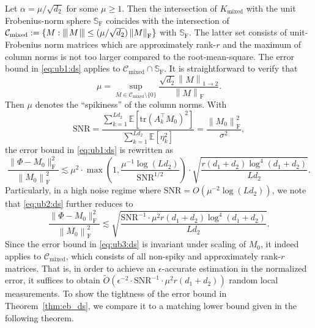 \documentclass[11pt]{article}
\newcommand{\xspace}{\hbox{\kern-2.5pt}}
\newcommand\tnorm[1]{\left\vert\xspace\left\vert\xspace\left\vert\mskip2mu
#1\mskip2mu \right\vert\xspace\right\vert\xspace\right\vert}
\newcommand{\norm}[1]{\left \|#1 \right \|}
\begin{document}
Let $\alpha = \mu/\sqrt{d_2}$ for some $\mu \geq 1$. 
Then the intersection of $K_\mathrm{mixed}$ with the unit Frobenius-norm sphere $\mathbb{S}_\mathrm{F}$ coincides with the intersection of $\mathcal{C}_\mathrm{mixed} := \{M : \tnorm{M} \leq (\mu/\sqrt{d_2}) \norm{M}_\mathrm{F}\}$ with $\mathbb{S}_\mathrm{F}$. 
The latter set consists of unit-Frobenius norm matrices which are approximately rank-$r$ and the maximum of column norms is not too larger compared to the root-mean-square. 
The error bound in \eqref{eq:ub1:ds} applies to $\mathcal{C}_\mathrm{mixed} \cap \mathbb{S}_\mathrm{F}$. 
It is straightforward to verify that
\[
\mu = \sup_{M \in \mathcal{C}_\mathrm{mixed}\setminus\{0\}} \frac{\sqrt{d_2} \norm{M}_{1\to 2}}{\norm{M}_\mathrm{F}}.
\]
Then $\mu$ denotes the ``spikiness'' of the column norms. 
With 
\[
\text{SNR} = \frac{\sum_{k=1}^{Ld_2} \mathbb{E}[\mathrm{tr}(A_k^\top M_0)^2]}{\sum_{k=1}^{Ld_2} \mathbb{E}[\eta_k^2]}
= \frac{\norm{M_0}_\mathrm{F}^2}{\sigma^2},
\]
the error bound in \eqref{eq:ub1:ds} is rewritten as 
\begin{equation}
\label{eq:ub2:ds}
\frac{\|\Phi - M_0\|_\mathrm{F}^2}{\norm{M_0}_\text{F}^2}
\lesssim \mu^2 \cdot \max\left(1, \frac{\mu^{-1} \log(Ld_2)}{\text{SNR}^{1/2}} \right) \cdot \sqrt{\frac{r(d_1+d_2)\log^4(d_1+d_2)}{Ld_2}}.
\end{equation}
Particularly, in a high noise regime where $\text{SNR} = O(\mu^{-2} \log(Ld_2))$, we note that \eqref{eq:ub2:ds} further reduces to 
\begin{equation}
\label{eq:ub3:ds}
\frac{\|\Phi - M_0\|_\mathrm{F}^2}{\norm{M_0}_\text{F}^2}
\lesssim \sqrt{\frac{\text{SNR}^{-1} \cdot \mu^2 r(d_1+d_2)\log^4(d_1+d_2)}{Ld_2}}. 
\end{equation}
Since the error bound in \eqref{eq:ub3:ds} is invariant under scaling of $M_0$, it indeed applies to $\mathcal{C}_\mathrm{mixed}$, which consists of all non-spiky and approximately rank-$r$ matrices. 
That is, in order to achieve an $\epsilon$-accurate estimation in the normalized error, it suffices to obtain $\widetilde{O}(\epsilon^{-2} \cdot \text{SNR}^{-1} \cdot \mu^2 r(d_1+d_2))$ random local measurements. 
To show the tightness of the error bound in Theorem~\ref{thm:eb_ds}, we compare it to a matching lower bound given in the following theorem. 
\end{document}
